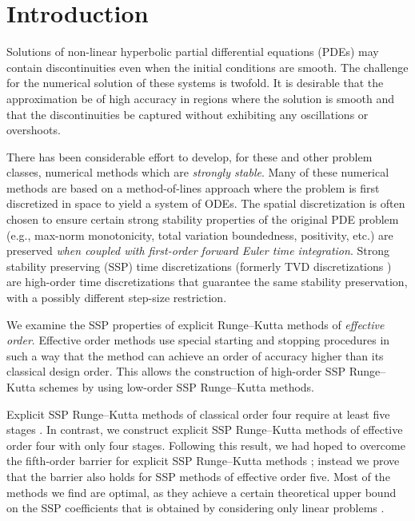 \section{Introduction}\label{sec:Intro}
Solutions of non-linear hyperbolic partial differential equations (PDEs) may 
contain discontinuities even when the initial conditions are smooth.
The challenge for the numerical solution of these systems is twofold. 
It is desirable that the approximation be of high accuracy in regions where 
the solution is smooth and that the discontinuities be captured without 
exhibiting any oscillations or overshoots. 

There has been considerable effort to develop, for these and other
problem classes, numerical methods which are \emph{strongly stable}.
Many of these numerical methods are based on a method-of-lines approach 
where the problem is first discretized in space to yield a system of ODEs. 
The spatial discretization is often chosen to ensure certain strong stability 
properties of the original PDE problem (e.g., max-norm monotonicity, 
total variation boundedness, positivity, etc.) are preserved
\emph{when coupled with first-order forward Euler time integration}.
Strong stability preserving (SSP) time discretizations (formerly TVD
discretizations \cite{Gottlieb/Shu:1998}) are high-order time
discretizations that guarantee the same stability preservation, with a
possibly different step-size restriction.

We examine the SSP properties of explicit Runge--Kutta methods of 
\emph{effective order}. 
Effective order methods use special starting and stopping procedures
in such a way that the method can achieve an order of
accuracy higher than its classical design order.
This allows the construction of high-order SSP Runge--Kutta schemes by
using low-order SSP Runge--Kutta methods.

Explicit SSP Runge--Kutta methods of classical order four require at 
least five stages \cite{Gottlieb/Shu:1998}. 
In contrast, we construct explicit SSP Runge--Kutta methods
of effective order four with only four stages.
Following this result, we had hoped to overcome the fifth-order
barrier for explicit SSP Runge--Kutta methods \cite{Ruuth2002}; instead we
prove that the barrier also holds for SSP methods of effective
order five.
Most of the methods we find are optimal, as they achieve a certain theoretical
upper bound on the SSP coefficients that is obtained by considering only
linear problems \cite{Kraaijevanger1986}.

